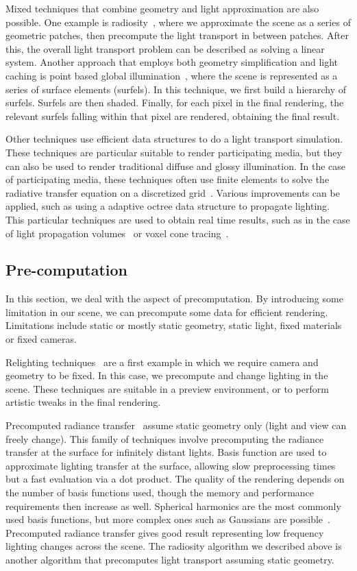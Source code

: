 Mixed techniques that combine geometry and light approximation are also possible. One example is radiosity~\cite{Goral1984}, where we approximate the scene as a series of geometric patches, then precompute the light transport in between patches. After this, the overall light transport problem can be described as solving a linear system. Another approach that employs both geometry simplification and light caching is point based global illumination~\cite{Christensen2008}, where the scene is represented as a series of surface elements (surfels). In this technique, we first build a hierarchy of surfels. Surfels are then shaded. Finally, for each pixel in the final rendering, the relevant surfels falling within that pixel are rendered, obtaining the final result. 

Other techniques use efficient data structures to do a light transport simulation. These techniques are particular suitable to render participating media, but they can also be used to render traditional diffuse and glossy illumination. In the case of participating media, these techniques often use finite elements to solve the radiative transfer equation on a discretized grid~\cite{Fattal2009}. Various improvements can be applied, such as using a adaptive octree data structure to propagate lighting. This particular techniques are used to obtain real time results, such as in the case of light propagation volumes~\cite{Kaplanyan2009,Borlum2011} or voxel cone tracing~\cite{Crassin2011}. 

\subsection{Pre-computation}
In this section, we deal with the aspect of precomputation. By introducing some limitation in our scene, we can precompute some data for efficient rendering. Limitations include static or mostly static geometry, static light, fixed materials or fixed cameras. 

Relighting techniques~\cite{Nimeroff94, Hasan2006} are a first example in which we require camera and geometry to be fixed. In this case, we precompute and change lighting in the scene. These techniques are suitable in a preview environment, or to perform artistic tweaks in the final rendering. %

Precomputed radiance transfer~\cite{Sloan2002} assume static geometry only (light and view can freely change). This family of techniques involve precomputing the radiance transfer at the surface for infinitely distant lights. Basis function are used to approximate lighting transfer at the surface, allowing slow preprocessing times but a fast evaluation via a dot product. The quality of the rendering depends on the number of basis functions used, though the memory and performance requirements then increase as well. Spherical harmonics are the most commonly used basis functions, but more complex ones such as Gaussians are possible~\cite{Green2006}. Precomputed radiance transfer gives good result representing low frequency lighting changes across the scene. The radiosity algorithm we described above is another algorithm that precomputes light transport assuming static geometry.

